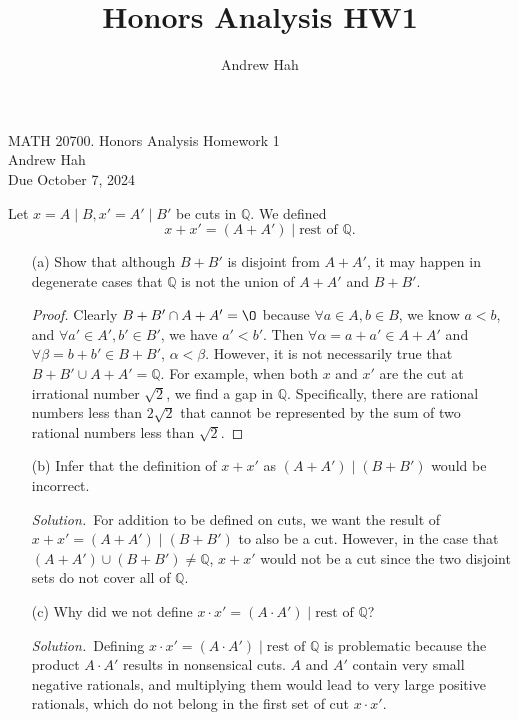 \documentclass[12pt]{article}
\title{Honors Analysis HW1}
\author{Andrew Hah}
\newcommand{\bbQ}{\mathbb{Q}}
\renewcommand{\_}[1]{\underline{ #1 }}
\renewcommand{\emptyset}{\O}
\theoremstyle{definition}
\newenvironment{exercise}[1]
  {\renewcommand\theinnercustomthm{#1}\innercustomthm}
  {\endinnercustomthm}
\newenvironment{solution}{\par\noindent\textit{Solution.}\ }{\par}
\numberwithin{equation}{subsection}
\begin{document}
\pagestyle{plain}
\begin{center}
{\Large MATH 20700. Honors Analysis Homework 1} \\ 
\vspace{.2in}  
Andrew Hah \\
Due October 7, 2024
\end{center}

\begin{exercise}{9}
    Let $x = A \mid B, x' = A' \mid B'$ be cuts in $\bbQ$. We defined $$x + x' = (A + A') \mid \text{rest of } \bbQ.$$
    \begin{itemize}
        \item [(a)] Show that although $B + B'$ is disjoint from $A + A'$, it may happen in degenerate cases that $\bbQ$ is not the union of $A + A'$ and $B + B'$.
        \begin{proof}
            Clearly $B + B' \cap A + A' = \emptyset$ because $\forall a \in A, b \in B$, we know $a < b$, and $\forall a' \in A', b' \in B'$, we have $a' < b'$. Then $\forall \alpha = a + a' \in A + A'$ and $\forall \beta = b + b' \in B + B'$, $\alpha < \beta$. However, it is not necessarily true that $B + B' \cup A + A' = \bbQ$. For example, when both $x$ and $x'$ are the cut at irrational number $\sqrt{2}$, we find a gap in $\bbQ$. Specifically, there are rational numbers less than $2 \sqrt{2}$ that cannot be represented by the sum of two rational numbers less than $\sqrt{2}$.
        \end{proof}
        \item [(b)] Infer that the definition of $x + x'$ as $(A + A') \mid (B + B')$ would be incorrect. 
            \begin{solution}For addition to be defined on cuts, we want the result of $x + x' = (A + A') \mid (B + B')$ to also be a cut. However, in the case that $(A + A') \cup (B + B') \neq \bbQ$, $x + x'$ would not be a cut since the two disjoint sets do not cover all of $\bbQ$.
            \end{solution}
        \item [(c)] Why did we not define $x \cdot x' = (A \cdot A') \mid \text{rest of } \bbQ$?
        \begin{solution}Defining $x \cdot x' = (A \cdot A') \mid \text{rest of } \mathbb{Q}$ is problematic because the product $A \cdot A'$ results in nonsensical cuts. $A$ and $A'$ contain very small negative rationals, and multiplying them would lead to very large positive rationals, which do not belong in the first set of cut $x \cdot x'$. 
        \end{solution}
    \end{itemize}
\end{exercise}
\end{document}
